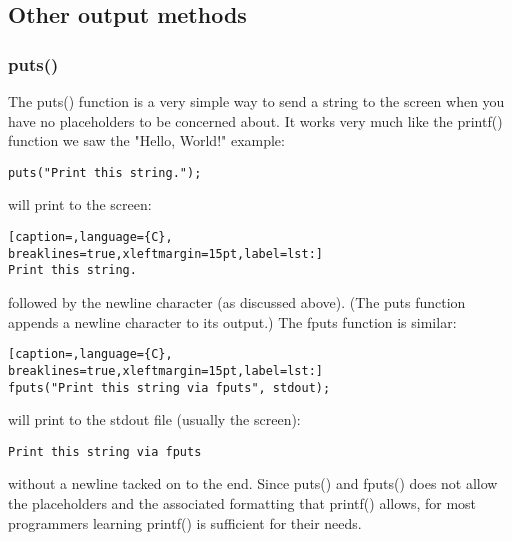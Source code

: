 \subsection{Other output methods}
\subsubsection{puts()}
The puts() function is a very simple way to send a string to the screen when
you have no placeholders to be concerned about. It works very much like the
printf() function we saw the "Hello, World!" example:
\scriptsize
\begin{verbatim}
puts("Print this string.");
\end{verbatim}
\normalsize

will print to the screen:
\lstset{basicstyle=\scriptsize, numbers=left, captionpos=b, tabsize=4}
\begin{lstlisting}[caption=,language={C},
breaklines=true,xleftmargin=15pt,label=lst:]
Print this string.
\end{lstlisting}

followed by the newline character (as discussed above). (The puts function
appends a newline character to its output.) The fputs function is similar:
\lstset{basicstyle=\scriptsize, numbers=left, captionpos=b, tabsize=4}
\begin{lstlisting}[caption=,language={C},
breaklines=true,xleftmargin=15pt,label=lst:]
fputs("Print this string via fputs", stdout);
\end{lstlisting}

will print to the stdout file (usually the screen):
\scriptsize
\begin{verbatim}
Print this string via fputs
\end{verbatim}
\normalsize

without a newline tacked on to the end.  Since puts() and fputs() does not
allow the placeholders and the associated formatting that printf() allows, for
most programmers learning printf() is sufficient for their needs.


